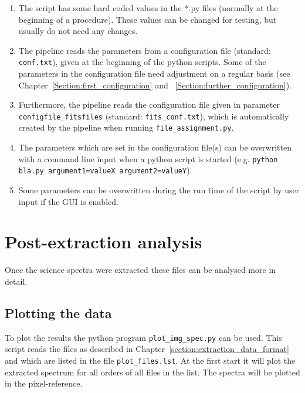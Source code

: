 \documentclass[10pt,a4paper]{article}
\begin{document}
\begin{enumerate}
  \item The script has some hard coded values in the *.py files (normally at the beginning of a procedure). These values can be changed for testing, but usually do not need any changes.
  \item The pipeline reads the parameters from a configuration file (standard: \verb|conf.txt|), given at the beginning of the python scripts. Some of the parameters in the configuration file need adjustment on a regular basis (see Chapter~\ref{Section:first_configuration} and ~\ref{Section:further_configuration}).
  \item Furthermore, the pipeline reads the configuration file given in parameter \verb|configfile_fitsfiles| (standard: \verb|fits_conf.txt|), which is automatically created by the pipeline when running \verb|file_assignment.py|.
  \item The parameters which are set in the configuration file(s) can be overwritten with a command line input when a python script is started (e.g. \verb|python bla.py argument1=valueX argument2=valueY|).
  \item Some parameters can be overwritten during the run time of the script by user input if the GUI is enabled.
\end{enumerate}




\newpage
\section{Post-extraction analysis}

\noindent Once the science spectra were extracted these files can be analysed more in detail. 

\subsection{Plotting the data}
\label{Section:Plotting_extracted_files}
To plot the results the python program \verb|plot_img_spec.py| can be used. This script reads the files as described in Chapter~\ref{section:extraction_data_format} and which are listed in the file \verb|plot_files.lst|. At the first start it will plot the extracted spectrum for all orders of all files in the list. The spectra will be plotted in the pixel-reference.
\end{document}
